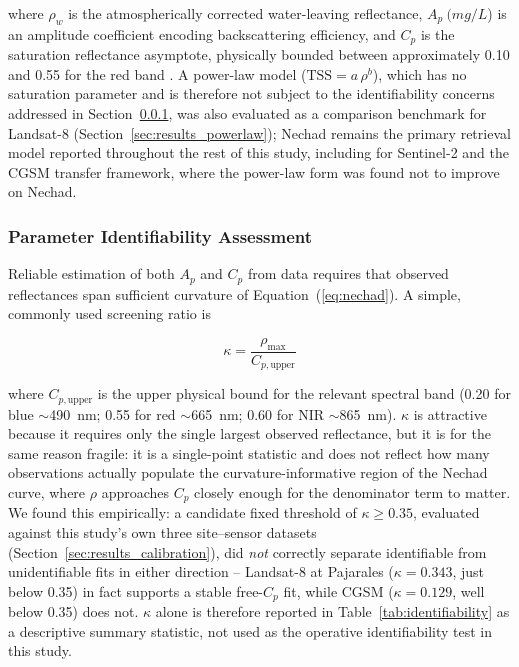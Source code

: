 \documentclass[remotesensing,article,submit,pdftex,moreauthors]{Definitions/mdpi}
\begin{document}
where $\rho_w$ is the atmospherically corrected water-leaving
reflectance, $A_p~(mg/L$) is an amplitude coefficient encoding
backscattering efficiency, and $C_p$ is the saturation reflectance
asymptote, physically bounded between approximately 0.10 and 0.55 for
the red band \citep{NECHAD2010854}. A power-law model
($\text{TSS} = a\,\rho^b$), which has no saturation parameter and is
therefore not subject to the identifiability concerns addressed in
Section~\ref{sec:identifiability}, was also evaluated as a comparison
benchmark for Landsat-8 (Section~\ref{sec:results_powerlaw}); Nechad
remains the primary retrieval model reported throughout the rest of
this study, including for Sentinel-2 and the CGSM transfer framework,
where the power-law form was found not to improve on Nechad.
 
 
\subsubsection{Parameter Identifiability Assessment}
\label{sec:identifiability}
 
Reliable estimation of both $A_p$ and $C_p$ from data requires that
observed reflectances span sufficient curvature of
Equation~(\ref{eq:nechad}). A simple, commonly used screening ratio is
 
\begin{equation}
\kappa = \frac{\rho_{\max}}{C_{p,\text{upper}}}
\label{eq:kappa}
\end{equation}
 
where $C_{p,\text{upper}}$ is the upper physical bound for the relevant
spectral band (0.20 for blue $\sim$490~nm; 0.55 for red $\sim$665~nm;
0.60 for NIR $\sim$865~nm). $\kappa$ is attractive because it requires
only the single largest observed reflectance, but it is for the same
reason fragile: it is a single-point statistic and does not reflect how
many observations actually populate the curvature-informative region of
the Nechad curve, where $\rho$ approaches $C_p$ closely enough for the
denominator term to matter. We found this empirically: a candidate
fixed threshold of $\kappa \geq 0.35$, evaluated against this study's
own three site--sensor datasets (Section~\ref{sec:results_calibration}),
did \emph{not} correctly separate identifiable from unidentifiable
fits in either direction -- Landsat-8 at Pajarales ($\kappa = 0.343$,
just below 0.35) in fact supports a stable free-$C_p$ fit, while CGSM
($\kappa = 0.129$, well below 0.35) does not. $\kappa$ alone is
therefore reported in Table~\ref{tab:identifiability} as a descriptive
summary statistic, not used as the operative identifiability test in
this study.
\end{document}
